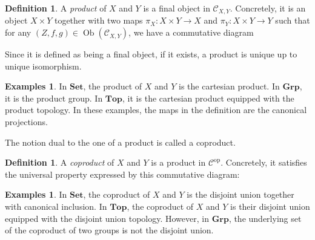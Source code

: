 \documentclass{article}
\newcommand{\op}{\mathrm{op}}
\newcommand{\cat}{\mathcal{C}}
\newcommand{\Set}{\mathbf{Set}}
\newcommand{\Top}{\mathbf{Top}}
\newcommand{\Grp}{\mathbf{Grp}}
\DeclareMathOperator{\Ob}{Ob}
\theoremstyle{plain}
\theoremstyle{definition}
\newtheorem{definition}[theorem]{Definition}
\newtheorem{examples}[theorem]{Examples}
\theoremstyle{remark}
\begin{document}
\begin{definition}
    A \emph{product} of $X$ and $Y$ is a final object in $\cat_{X,Y}$. Concretely, it is an object $X \times Y$ together with two maps $\pi_X : X \times Y \to X$ and $\pi_Y : X \times Y \to Y$ such that for any $(Z,f,g) \in \Ob(\cat_{X,Y})$, we have a commutative diagram
    \begin{center}
    \end{center}
\end{definition}

Since it is defined as being a final object, if it exists, a product is unique up to unique isomorphism.

\begin{examples}
    In $\Set$, the product of $X$ and $Y$ is the cartesian product. In $\Grp$, it is the product group. In $\Top$, it is the cartesian product equipped with the product topology. In these examples, the maps in the definition are the canonical projections.
\end{examples}

The notion dual to the one of a product is called a coproduct.

\begin{definition}
    A \emph{coproduct} of $X$ and $Y$ is a product in $\cat^\op$. Concretely, it satisfies the universal property expressed by this commutative diagram:
    \begin{center}
    \end{center}
\end{definition}

\begin{examples}
    In $\Set$, the coproduct of $X$ and $Y$ is the disjoint union together with canonical inclusion. In $\Top$, the coproduct of $X$ and $Y$ is their disjoint union equipped with the disjoint union topology. However, in $\Grp$, the underlying set of the coproduct of two groups is not the disjoint union.
\end{examples}
\end{document}
